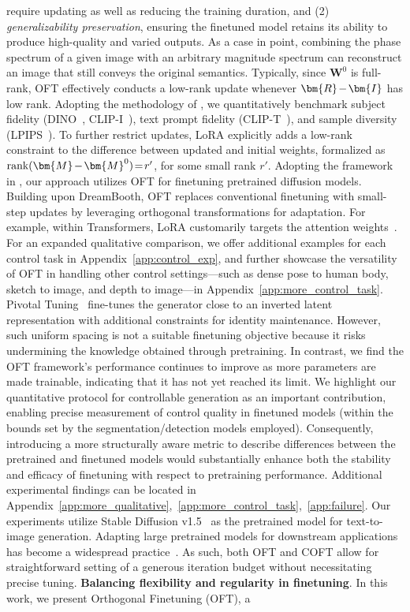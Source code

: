 require updating as well as reducing the training duration, and (2) \emph{generalizability preservation}, ensuring the finetuned model retains its ability to produce high-quality and varied outputs. As a case in point, combining the phase spectrum of a given image with an arbitrary magnitude spectrum can reconstruct an image that still conveys the original semantics. Typically, since $\bm{W}^0$ is full-rank, OFT effectively conducts a low-rank update whenever $\thickmuskip=2mu \medmuskip=2mu \bm{R}-\bm{I}$ has low rank. Adopting the methodology of \cite{ruiz2023dreambooth}, we quantitatively benchmark subject fidelity (DINO~\cite{caron2021emerging}, CLIP-I~\cite{radford2021learning}), text prompt fidelity (CLIP-T~\cite{radford2021learning}), and sample diversity (LPIPS~\cite{zhang2018unreasonable}). To further restrict updates, LoRA explicitly adds a low-rank constraint to the difference between updated and initial weights, formalized as $\thickmuskip=2mu \medmuskip=2mu \text{rank}(\bm{M} - \bm{M}^0)=r'$, for some small rank $r'$. Adopting the framework in \cite{zhang2023adding,mou2023t2i}, our approach utilizes OFT for finetuning pretrained diffusion models. Building upon DreamBooth, OFT replaces conventional finetuning with small-step updates by leveraging orthogonal transformations for adaptation. For example, within Transformers, LoRA customarily targets the attention weights~\cite{hulora2022}. For an expanded qualitative comparison, we offer additional examples for each control task in Appendix~\ref{app:control_exp}, and further showcase the versatility of OFT in handling other control settings—such as dense pose to human body, sketch to image, and depth to image—in Appendix~\ref{app:more_control_task}. Pivotal Tuning~\cite{roich2022pivotal} fine-tunes the generator close to an inverted latent representation with additional constraints for identity maintenance. However, such uniform spacing is not a suitable finetuning objective because it risks undermining the knowledge obtained through pretraining. In contrast, we find the OFT framework’s performance continues to improve as more parameters are made trainable, indicating that it has not yet reached its limit. We highlight our quantitative protocol for controllable generation as an important contribution, enabling precise measurement of control quality in finetuned models (within the bounds set by the segmentation/detection models employed). Consequently, introducing a more structurally aware metric to describe differences between the pretrained and finetuned models would substantially enhance both the stability and efficacy of finetuning with respect to pretraining performance. Additional experimental findings can be located in Appendix~\ref{app:more_qualitative},~\ref{app:more_control_task},~\ref{app:failure}. Our experiments utilize Stable Diffusion v1.5~\cite{rombach2022high} as the pretrained model for text-to-image generation. Adapting large pretrained models for downstream applications has become a widespread practice~\cite{devlin2018bert,brown2020language,he2022masked}. As such, both OFT and COFT allow for straightforward setting of a generous iteration budget without necessitating precise tuning. \textbf{Balancing flexibility and regularity in finetuning}. In this work, we present Orthogonal Finetuning (OFT), a 